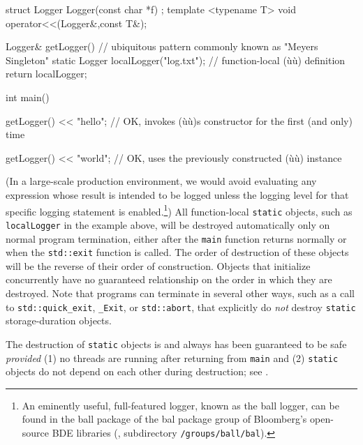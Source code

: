 \begin{emcppshiddenlisting}[emcppsbatch=e3]
struct Logger {
  Logger(const char *f) {}
};
template <typename T>
void operator<<(Logger&,const T&);
\end{emcppshiddenlisting}
\begin{emcppslisting}[emcppsbatch=e3]
Logger& getLogger()  // ubiquitous pattern commonly known as "Meyers Singleton"
{
    static Logger localLogger("log.txt");  // function-local (ù{}ù) definition
    return localLogger;
}

int main()
{
    getLogger() << "hello";
        // OK, invokes (ù{}ù)s constructor for the first (and only) time

    getLogger() << "world";
        // OK, uses the previously constructed (ù{}ù) instance
}
\end{emcppslisting}

\noindent (In a large-scale production environment, we would avoid evaluating any expression whose result is intended to be logged unless the logging level for that specific logging statement is enabled.{\cprotect\footnote{An eminently useful,
full-featured logger, known as the {ball} logger, can be found in the
{ball} package of the {bal} package group of Bloomberg's open-source
  BDE libraries (\cite{bde14}, subdirectory \texttt{/groups/ball/bal}).}}) All function-local \lstinline!static! objects, such as \lstinline!localLogger!
in the example above, will be destroyed automatically only on normal
program termination, either after the \lstinline!main! function returns
normally or when the \lstinline!std::exit! function is
called. The order of destruction
of these objects will be the reverse of their order of construction.
Objects that initialize concurrently have no guaranteed relationship on
the order in which they are destroyed. Note that programs can terminate in several other ways,
such as a call to \lstinline!std::quick_exit!, \lstinline!_Exit!, or
\lstinline!std::abort!, that explicitly do \emph{not} destroy
  \lstinline!static! storage-duration objects.

The destruction of  \lstinline!static! objects is
and always has been guaranteed to be safe \emph{provided} (1) no threads
are running after returning from \lstinline!main! and (2)
 \lstinline!static! objects do not depend on each
other during destruction; see .

